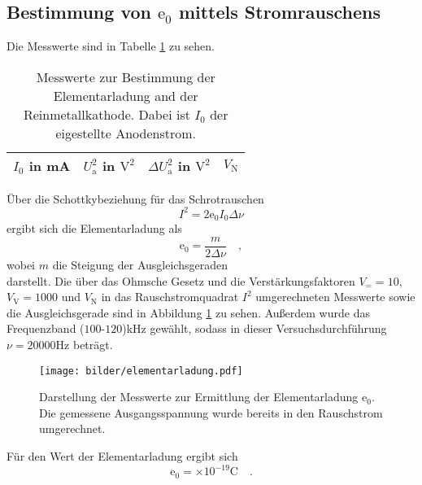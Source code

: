	
	
\clearpage
\subsection{Bestimmung von $\text{e}_0$ mittels Stromrauschens}

	Die Messwerte sind in Tabelle \ref{tab:elementarladung_messwerte} 
	zu sehen.
	\begin{table}[h]
	\centering
		\begin{tabular}{cccc}
		\toprule 
		\midrule
			$I_0$ in mA & $U^2_\text{a}$ in $\text{V}^2$ &
			$\Delta U_\text{a}^2$ in $\text{V}^2$ & $V_\text{N}$ \\
			\midrule
			
			\midrule 
			\bottomrule
		\end{tabular}
		\caption{Messwerte zur Bestimmung der Elementarladung 
		and der Reinmetallkathode. Dabei ist $I_0$ der eigestellte 
		Anodenstrom.}
		\label{tab:elementarladung_messwerte}
	\end{table}
	
	Über die Schottkybeziehung für das Schrotrauschen 
	\begin{equation}
		I^2 = 2 \text{e}_0 I_0 \Delta \nu
	\end{equation}		
	ergibt sich die Elementarladung als 
	\begin{equation}
	\text{e}_0 = \frac{m}{2 \Delta \nu} \quad ,
	\end{equation}
	wobei $m$ die Steigung der Ausgleichsgeraden 
	\begin{equation}
	
	\end{equation}
	darstellt. Die über das Ohmsche Gesetz und die 
	Verstärkungsfaktoren $V_= =10$, $V_\text{V}=1000$ und 
	$V_\text{N}$ in das Rauschstromquadrat $I^2$ umgerechneten 
	Messwerte sowie die Ausgleichsgerade sind in Abbildung 
	\ref{fig:elementarladung} zu sehen. Außerdem wurde das 
	Frequenzband ($100$-$120$)kHz gewählt, sodass in dieser 
	Versuchsdurchführung $\nu = 20000$Hz beträgt.
		
	\begin{figure}
		\centering
		\texttt{[image: bilder/elementarladung.pdf]}
		\caption{Darstellung der Messwerte zur Ermittlung der 
		Elementarladung $\text{e}_0$. Die gemessene Ausgangsspannung 
		wurde bereits in den Rauschstrom umgerechnet.}
		\label{fig:elementarladung}
	\end{figure}
	
	Für den Wert der Elementarladung ergibt sich 
	\begin{equation}
	\text{e}_0 =  \times 
				10^{-19}\text{C} \quad .
	\end{equation}
	
